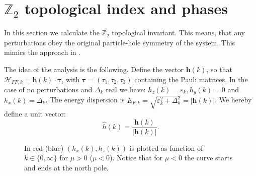 \section{\texorpdfstring{$\mathbb{Z}_2$}{Z2} topological index and phases}
\label{sec.topindexandphases}
In this section we calculate the $\mathbb{Z}_2$ topological invariant. This means, that any perturbations obey the original particle-hole symmetry of the system. This mimics the approach in \cite{Alicea}.

 The idea of the analysis is the following. Define the vector $\mathbf{h}(k)$, so that $\mathcal{H}_{FF,k} = \mathbf{h}(k)\cdot\boldsymbol\tau$, with $\boldsymbol\tau = (\tau_1,\tau_2,\tau_3)$ containing the Pauli matrices. In the case of no perturbations and $\Delta_k$ real we have: $h_z(k) = \varepsilon_k, h_y(k) = 0$ and $h_x(k) = \Delta_k$. The energy dispersion is $E_{F,k} = \sqrt{\varepsilon^2_k + \Delta^2_k} = |\mathbf{h}(k)|$. We hereby define a unit vector:
\begin{equation}
\hat{h}(k) = \frac{\mathbf{h}(k)}{|\mathbf{h}(k)|}. 
\label{eq.hhatdefinition}
\end{equation}

\begin{figure}
\center
{}
\caption{In red (blue) $(h_x(k),h_z(k))$ is plotted as function of $k\in \{0, \infty\}$ for $\mu > 0$ ($\mu < 0$). Notice that for $\mu < 0$ the curve starts and ends at the north pole.}
\label{fig.hhatplot}
\end{figure}

